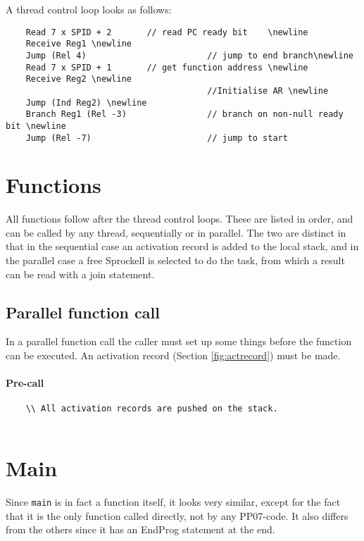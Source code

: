 \documentclass[10pt,a4paper]{report}
\begin{document}
A thread control loop looks as follows:
\begin{verbatim}
	Read 7 x SPID + 2		// read PC ready bit 	\newline
	Receive Reg1 \newline
	Jump (Rel 4)						// jump to end branch\newline
	Read 7 x SPID + 1		// get function address \newline
	Receive Reg2 \newline
										//Initialise AR \newline
	Jump (Ind Reg2) \newline
	Branch Reg1 (Rel -3)				// branch on non-null ready bit \newline
	Jump (Rel -7)						// jump to start
\end{verbatim}

\section{Functions}
All functions follow after the thread control loops. These are listed in order, and can be called by any thread, sequentially or in parallel. The two are distinct in that in the sequential case an activation record is added to the local stack, and in the parallel case a free Sprockell is selected to do the task, from which a result can be read with a join statement.

\subsection{Parallel function call}
In a parallel function call the caller must set up some things before the function can be executed. An activation record (Section \ref{fig:actrecord}) must be made. 

\paragraph{Pre-call}
\begin{verbatim}
	\\ All activation records are pushed on the stack.
	
\end{verbatim}


\section{Main}
Since \texttt{main} is in fact a function itself, it looks very similar, except for the fact that it is the only function called directly, not by any PP07-code. It also differs from the others since it has an EndProg statement at the end.
\end{document}
